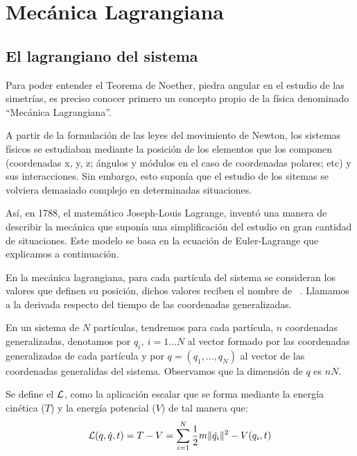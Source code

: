 \chapter{Mecánica Lagrangiana}\label{ch:mecanica-lagrangiana}

\section{El lagrangiano del sistema}\label{sec:el-lagrangiano-del-sistema}

Para poder entender el Teorema de Noether, piedra angular en el estudio de las simetrías, es preciso conocer primero un concepto propio de la física denominado \textquotedblleft Mecánica Lagrangiana\textquotedblright.

A partir de la formulación de las leyes del movimiento de Newton, los sistemas físicos se estudiaban mediante la posición de los elementos que los componen (coordenadas x, y, z; ángulos y módulos en el caso de coordenadas polares; etc) y sus interacciones.
Sin embargo, esto suponía que el estudio de los sitemas se volviera demasiado complejo en determinadas situaciones.

Así, en 1788, el matemático Joseph-Louis Lagrange, inventó una manera de describir la mecánica que suponía una simplificación del estudio en gran cantidad de situaciones.
Este modelo se basa en la ecuación de Euler-Lagrange que explicamos a continuación.

En la mecánica lagrangiana, para cada partícula del sistema se consideran los valores que definen su posición, dichos valores reciben el nombre de ~\cite{GTP}.
Llamamos  a la derivada respecto del tiempo de las coordenadas generalizadas.

En un sistema de $N$ partículas, tendremos para cada partícula, $n$ coordenadas generalizadas, denotamos por $q_i,\ i=1\dots N$ al vector formado por las coordenadas generalizadas de cada partícula y por $q=(q_1,\dots,q_N)$ al vector de las coordenadas generalidas del sistema.
Observamos que la dimensión de $q$ es $nN$.

Se define el  $\mathcal{L}$, como la aplicación escalar que se forma mediante la energía cinética ($T$) y la energía potencial ($V$) de tal manera que:
\begin{equation}
	\label{eq:lagrangiano_clasico}
	\mathcal{L}(q,\dot{q},t)=T-V=\sum\limits_{i=1}^{N} \frac{1}{2}m\|\dot{q_i}\|^2-V(q_i,t)
\end{equation}

